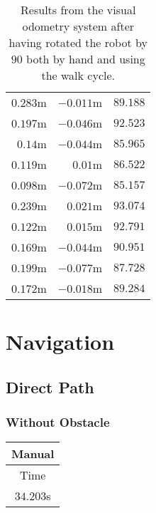 \begin{appendices}
\begin{table}[!h]
\begin{tabular}{ r r r }
		$0.283$m &
		$-0.011$m &
		$89.188$\textdegree{} \\

		$0.197$m &
		$-0.046$m &
		$92.523$\textdegree{} \\

		$0.14$m &
		$-0.044$m &
		$85.965$\textdegree{} \\

		$0.119$m &
		$0.01$m &
		$86.522$\textdegree{} \\

		$0.098$m &
		$-0.072$m &
		$85.157$\textdegree{} \\

		$0.239$m &
		$0.021$m &
		$93.074$\textdegree{} \\

		$0.122$m &
		$0.015$m &
		$92.791$\textdegree{} \\

		$0.169$m &
		$-0.044$m &
		$90.951$\textdegree{} \\

		$0.199$m &
		$-0.077$m &
		$87.728$\textdegree{} \\

		\midrule
		$0.172$m &
		$-0.018$m &
		$89.284$\textdegree{} \\
		\bottomrule
	\end{tabular}

	\caption{Results from the visual odometry system after having rotated the robot by $90$\textdegree{} both by hand and using the walk cycle.}
	\label{tab:eval_vo_rot}
\end{table}

\section{Navigation}

\subsection{Direct Path}

\subsubsection{Without Obstacle}

\begin{table}[!h]
	\centering
	\begin{tabular}{ c }
		\toprule
		\textbf{Manual} \\
		\midrule
		Time \\
		\midrule
		$34.203$s \\


\end{tabular}
\end{table}
\end{appendices}
